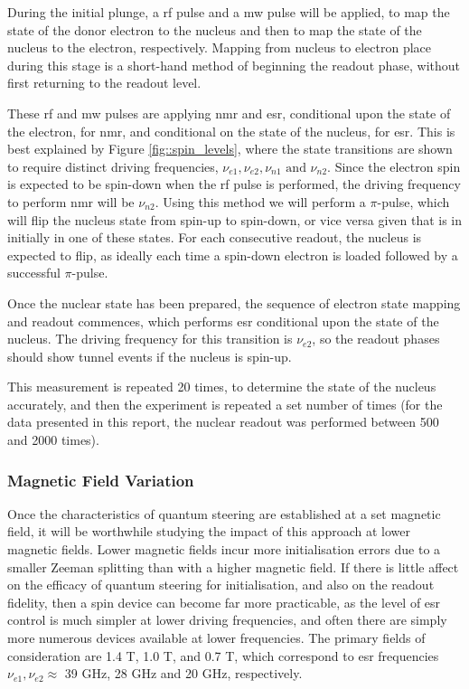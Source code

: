 		During the initial plunge, a \gls{rf} pulse and a \gls{mw} pulse will be applied, to map the state of the donor electron to the nucleus and then to map the state of the nucleus to the electron, respectively. Mapping from nucleus to electron place during this stage is a short-hand method of beginning the readout phase, without first returning to the readout level.
		
		These \gls{rf} and \gls{mw} pulses are applying \gls{nmr} and \gls{esr}, conditional upon the state of the electron, for \gls{nmr}, and conditional on the state of the nucleus, for \gls{esr}. This is best explained by Figure \ref{fig::spin_levels}, where the state transitions are shown to require distinct driving frequencies, $\nu_{e1}, \nu_{e2}, \nu_{n1} \textrm{ and } \nu_{n2}$. Since the electron spin is expected to be spin-down when the \gls{rf} pulse is performed, the driving frequency to perform \gls{nmr} will be $\nu_{n2}$. Using this method we will perform a $\pi$-pulse, which will flip the nucleus state from spin-up to spin-down, or vice versa given that is in initially in one of these states. For each consecutive readout, the nucleus is expected to flip, as ideally each time a spin-down electron is loaded followed by a successful $\pi$-pulse.
		
		Once the nuclear state has been prepared, the sequence of electron state mapping and readout commences, which performs \gls{esr} conditional upon the state of the nucleus. The driving frequency for this transition is $\nu_{e2}$, so the readout phases should show tunnel events if the nucleus is spin-up.
	
		This measurement is repeated 20 times, to determine the state of the nucleus accurately, and then the experiment is repeated a set number of times (for the data presented in this report, the nuclear readout was performed between 500 and 2000 times). 
		
	\subsubsection{Magnetic Field Variation}
		Once the characteristics of quantum steering are established at a set magnetic field, it will be worthwhile studying the impact of this approach at lower magnetic fields. Lower magnetic fields incur more initialisation errors due to a smaller Zeeman splitting than with a higher magnetic field. If there is little affect on the efficacy of quantum steering for initialisation, and also on the readout fidelity, then a spin device can become far more practicable, as the level of \gls{esr} control is much simpler at lower driving frequencies, and often there are simply more numerous devices available at lower frequencies. The primary fields of consideration are 1.4 T, 1.0 T, and 0.7 T, which correspond to \gls{esr} frequencies  $\nu_{e1}, \nu_{e2} \approx$ 39 GHz, 28 GHz and 20 GHz, respectively.
		
